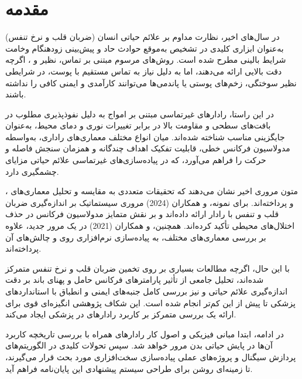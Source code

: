 \section{مقدمه}\label{sec:intro-cap3}

در سال‌های اخیر، نظارت مداوم بر علائم حیاتی انسان (ضربان قلب و نرخ تنفس) به‌عنوان ابزاری کلیدی در تشخیص به‌موقع حوادث حاد و پیش‌بینی زودهنگام وخامت شرایط بالینی مطرح شده است. روش‌های مرسوم مبتنی بر تماس، نظیر  و ، اگرچه دقت بالایی ارائه می‌دهند، اما به دلیل نیاز به تماس مستقیم با پوست، در شرایطی نظیر سوختگی، زخم‌های پوستی یا پاندمی‌ها می‌توانند کارآمدی و ایمنی کافی را نداشته باشند.

در این راستا، رادارهای غیرتماسی مبتنی بر امواج  به دلیل نفوذپذیری مطلوب در بافت‌های سطحی و مقاومت بالا در برابر تغییرات نوری و دمای محیط، به‌عنوان جایگزینی مناسب شناخته شده‌اند. میان انواع مختلف معماری‌های راداری،  به‌واسطه مدولاسیون فرکانس خطی، قابلیت تفکیک اهداف چندگانه و همزمان سنجش فاصله و حرکت را فراهم می‌آورد، که در پیاده‌سازی‌های غیرتماسی علائم حیاتی مزایای چشمگیری دارد.

متون مروری اخیر نشان می‌دهند که تحقیقات متعددی به مقایسه و تحلیل معماری‌های ،  و  پرداخته‌اند. برای نمونه،  و همکاران (2024) مروری سیستماتیک بر اندازه‌گیری ضربان قلب و تنفس با رادار ارائه داده‌اند و بر نقش متمایز مدولاسیون فرکانس در حذف اختلال‌های محیطی تأکید کرده‌اند. همچنین،  و همکاران (2021) در یک مرور جدید، علاوه بر بررسی معماری‌های مختلف، به پیاده‌سازی نرم‌افزاری روی  و چالش‌های آن پرداخته‌اند.

با این حال، اگرچه مطالعات بسیاری بر روی تخمین ضربان قلب و نرخ تنفس متمرکز شده‌اند، تحلیل جامعی از تأثیر پارامترهای فرکانس حامل و پهنای باند بر دقت اندازه‌گیری علائم حیاتی و نیز بررسی کامل جنبه‌های ایمنی و انطباق با استانداردهای پزشکی تا پیش از این کم‌تر انجام شده است. این شکاف پژوهشی انگیزه‌ای قوی برای ارائه یک بررسی متمرکز بر کاربرد رادارهای  در پزشکی ایجاد می‌کند.

در ادامه، ابتدا مبانی فیزیکی و اصول کار رادارهای  همراه با بررسی تاریخچه کاربرد آن‌ها در پایش حیاتی بدن مرور خواهد شد. سپس تحولات کلیدی در الگوریتم‌های پردازش سیگنال و پروژه‌های عملی پیاده‌سازی سخت‌افزاری مورد بحث قرار می‌گیرند، تا زمینه‌ای روشن برای طراحی سیستم پیشنهادی این پایان‌نامه فراهم آید.
